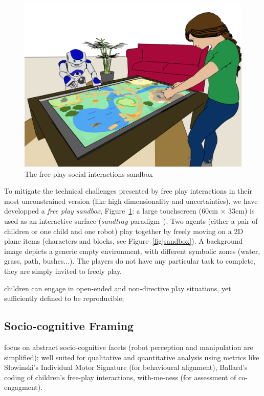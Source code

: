 \documentclass[a4paper]{article}
\begin{document}
\begin{figure}
    \centering
    \includegraphics[width=0.9\linewidth]{setup.png}
    \caption{The free play social interactions sandbox}
    \label{fig|setup}
\end{figure}

To mitigate the technical challenges presented by free play interactions in
their most unconstrained version (like
high dimensionality and uncertainties), we have developped a \emph{free play
sandbox}, Figure~\ref{fig|setup}: a large touchscreen (60cm $\times$ 33cm) is
used as an interactive surface (\emph{sandtray}
paradigm~\cite{baxter2012touchscreen}). Two agents (either a pair of children or
one child and one robot) play together by freely moving on a 2D plane items
(characters and blocks, see Figure~\ref{fig|sandbox}). A background image
depicts a generic empty environment, with different symbolic zones (water,
grass, path, bushes...). The players do not have any particular task to
complete, they are simply invited to freely play.


children can engage in open-ended and
non-directive play situations, yet sufficiently
defined to be reproducible; 

\subsection{Socio-cognitive Framing}

focus on abstract socio-cognitive facets (robot
perception and manipulation are simplified); well suited for qualitative and
quantitative analysis using metrics like Słowinski’s Individual Motor Signature
(for behavioural alignment), Ballard’s coding of children’s free-play
interactions, with-me-ness (for assessment of co-engagment).
\end{document}
